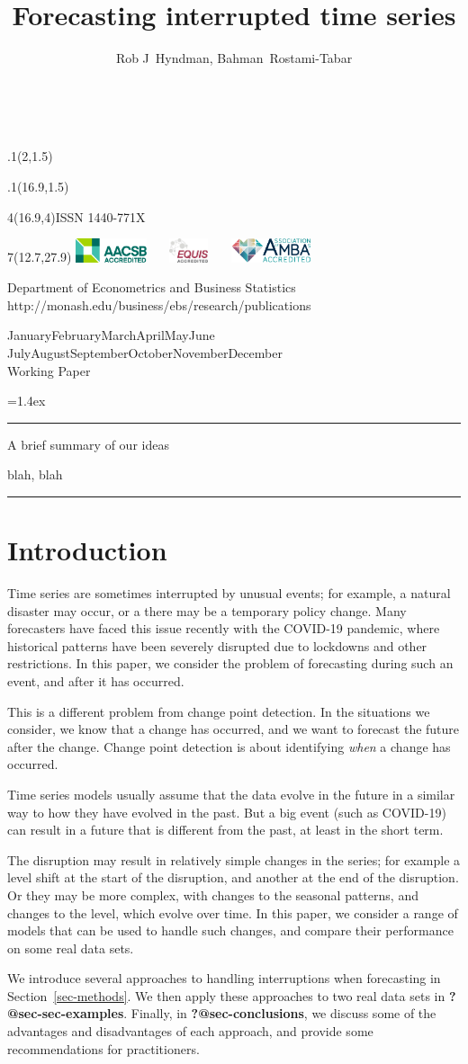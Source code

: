 \documentclass[11pt,a4paper,]{article}
\title{Forecasting interrupted time series}
\author{Rob J~Hyndman, Bahman~Rostami-Tabar}
\date{\sf\Date~\Month~\Year}
\makeatletter
\def\Date{\number\day}
\def\Month{\ifcase\month\or
 January\or February\or March\or April\or May\or June\or
 July\or August\or September\or October\or November\or December\fi}
\def\Year{\number\year}
\def\showjel{{\large\textsf{\textbf{JEL classification:}}~\@jel}}
\def\cover{{\sffamily\setcounter{page}{0}
        \thispagestyle{empty}
        \placefig{2}{1.5}{width=5cm}{_extensions/numbats/wp/monash2}
        \placefig{16.9}{1.5}{width=2.1cm}{_extensions/numbats/wp/MBSportrait}
        \begin{textblock}{4}(16.9,4)ISSN 1440-771X\end{textblock}
        \begin{textblock}{7}(12.7,27.9)\hfill
        \includegraphics[height=0.7cm]{_extensions/numbats/wp/AACSB}~~~
        \includegraphics[height=0.7cm]{_extensions/numbats/wp/EQUIS}~~~
        \includegraphics[height=0.7cm]{_extensions/numbats/wp/AMBA}
        \end{textblock}
        \vspace*{2cm}
        \begin{center}\Large
        Department of Econometrics and Business Statistics\\[.5cm]
        \footnotesize http://monash.edu/business/ebs/research/publications
        \end{center}\vspace{2cm}
        \begin{center}
        \fbox{\parbox{14cm}{\begin{onehalfspace}\centering\Huge\vspace*{0.3cm}
                \textsf{\textbf{\expandafter{\@title}}}\vspace{1cm}\par
                \LARGE\@author\end{onehalfspace}
        }}
        \end{center}
        \vfill
                \begin{center}\Large
                \Month~\Year\\[1cm]
                Working Paper \@wp
        \end{center}\vspace*{2cm}}}
\def\pageone{{\sffamily\setstretch{1}%
        \thispagestyle{empty}%
        \vbox to \textheight{%
        \raggedright\baselineskip=1.2cm
     {\fontsize{24.88}{30}\sffamily\textbf{\expandafter{\@title}}}
        \vspace{2cm}\par
        \hspace{1cm}\parbox{14cm}{\sffamily\large\@addresses}\vspace{1cm}\vfill
        \hspace{1cm}{\large\Date~\Month~\Year}\\[1cm]
        \hspace{1cm}\showjel\vss}}}
\def\blindtitle{{\sffamily
     \thispagestyle{plain}\raggedright\baselineskip=1.2cm
     {\fontsize{24.88}{30}\sffamily\textbf{\expandafter{\@title}}}\vspace{1cm}\par
        }}
\def\titlepage{{\cover\newpage\pageone\newpage\blindtitle}}
\let\maketitle\titlepage
\newenvironment{keywords}{\par\vspace{0.5cm}\noindent{\sffamily\textbf{Keywords:}}}{\vspace{0.25cm}\par\hrule\vspace{0.5cm}\par}
\renewenvironment{abstract}{\begin{minipage}{\textwidth}\parskip=1.4ex\noindent
\hrule\vspace{0.1cm}\par{\sffamily\textbf{\abstractname}}\newline}
  {\end{minipage}}
\def\placefig#1#2#3#4{\begin{textblock}{.1}(#1,#2)\rlap{\texttt{[image: \#4]}}\end{textblock}}
\makeatother
\begin{document}
\maketitle
\begin{abstract}
A brief summary of our ideas
\end{abstract}
\begin{keywords}
blah, blah
\end{keywords}

\section{Introduction}\label{introduction}

Time series are sometimes interrupted by unusual events; for example, a
natural disaster may occur, or a there may be a temporary policy change.
Many forecasters have faced this issue recently with the COVID-19
pandemic, where historical patterns have been severely disrupted due to
lockdowns and other restrictions. In this paper, we consider the problem
of forecasting during such an event, and after it has occurred.

This is a different problem from change point detection. In the
situations we consider, we know that a change has occurred, and we want
to forecast the future after the change. Change point detection is about
identifying \emph{when} a change has occurred.

Time series models usually assume that the data evolve in the future in
a similar way to how they have evolved in the past. But a big event
(such as COVID-19) can result in a future that is different from the
past, at least in the short term.

The disruption may result in relatively simple changes in the series;
for example a level shift at the start of the disruption, and another at
the end of the disruption. Or they may be more complex, with changes to
the seasonal patterns, and changes to the level, which evolve over time.
In this paper, we consider a range of models that can be used to handle
such changes, and compare their performance on some real data sets.

We introduce several approaches to handling interruptions when
forecasting in Section~\ref{sec-methods}. We then apply these approaches
to two real data sets in \textbf{?@sec-sec-examples}. Finally, in
\textbf{?@sec-conclusions}, we discuss some of the advantages and
disadvantages of each approach, and provide some recommendations for
practitioners.
\end{document}
